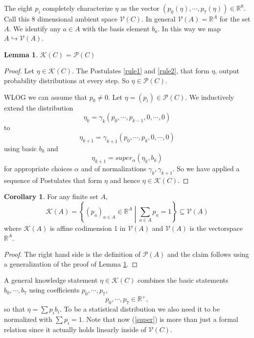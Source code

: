 \documentclass[12pt,a4paper]{article}
\theoremstyle{myrule}
\theoremstyle{postulate}
\theoremstyle{definition}
\newtheorem{corollary}{Corollary}[theorem]
\newtheorem{lemma}[theorem]{Lemma}
\begin{document}
The eight $p_i$ completely characterize $\eta$ as the vector $(p_\mathit{0}(\eta),\cdots,p_\mathit{7}(\eta)) \in \mathbb{R}^8$.  Call this 8 dimensional ambient space $\mathcal{V}(C)$. In general $\mathcal{V}(A) = \mathbb{R}^A$ for the set $A$.  We identify any $a \in A$ with the basis element $b_a$.  In this way we map $A \hookrightarrow \mathcal{V}(A)$.
\begin{lemma}
\label{prob}
  $\mathcal{K}(C)$ = $\mathcal{P}(C)$
\end{lemma}
\begin{proof}
  Let $\eta \in \mathcal{K}(C)$.  The Postulates \ref{rule1} and \ref{rule2}, that form $\eta$, output probability distributions at every step.  So $\eta \in \mathcal{P}(C)$.
  
  WLOG we can assume that $p_0 \not = 0$.  Let $\eta = (p_i) \in \mathcal{P}(C)$.  We inductively extend the distribution
  \[
  \eta_k = \gamma_k (p_0, \cdots, p_{k-1}, 0, \cdots, 0)
  \]
  to
  \[
  \eta_{k+1} = \gamma_{k+1} (p_0, \cdots, p_{k}, 0, \cdots, 0)
  \]
  using basic $b_k$ and 
  \[
  \eta_{k+1} = super_\alpha(\eta_k,b_k)
  \]
  for appropriate choices $\alpha$ and of normalizations $\gamma_k, \gamma_{k+1}$. So we have applied a sequence of Postulates that form $\eta$ and hence $\eta \in \mathcal{K}(C)$.
\end{proof}

\begin{corollary}
  For any finite set $A$,
  \[
  \mathcal{K}(A) = \left\{ (p_a)_{a \in A} \in \mathbb{R}^{A} \middle | \sum_{a \in A} p_a = 1 \right\}  \subseteq \mathcal{V}(A)
  \]
where $\mathcal{K}(A)$ is affine codimension 1 in $\mathcal{V}(A)$ and $\mathcal{V}(A)$ is the vectorspace $\mathbb{R}^A$.
\end{corollary}
\begin{proof}
  The right hand side is the definition of $\mathcal{P}(A)$ and the claim follows using a generalization of the proof of Lemma \ref{prob}.
\end{proof}

A general knowledge statement $\eta \in \mathcal{K}(C)$ combines the basic statements $b_\mathit{0}, \cdots, b_\mathit{7}$ using coefficients $p_\mathit{0}, \cdots, p_\mathit{7}$,
\[
  p_\mathit{0},\cdots,p_{\mathit{7}} \in \mathbb{R}^+,
\]so that $\eta = \sum p_i b_i$.  To be a statistical distribution we also need it to be normalized with $\sum p_i = 1$.  Note that now (\ref{super}) is more than just a formal relation since it actually holds linearly inside of $\mathcal{V}(C)$.
\end{document}
